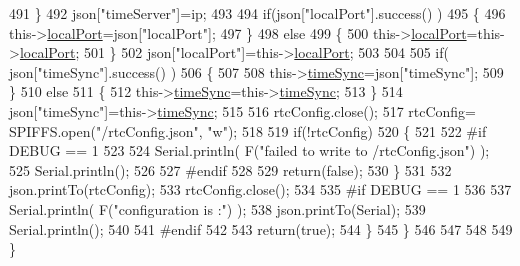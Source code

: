 \begin{DoxyCode}
491             \}
492             json[\textcolor{stringliteral}{"timeServer"}]=ip;
493             
494             \textcolor{keywordflow}{if}(json[\textcolor{stringliteral}{"localPort"}].success() )
495             \{                       
496                 this->\hyperlink{class_cool_time_a2f777da44d7ba678be8185299e9b49d1}{localPort}=json[\textcolor{stringliteral}{"localPort"}];
497             \}
498             \textcolor{keywordflow}{else}
499             \{
500                 this->\hyperlink{class_cool_time_a2f777da44d7ba678be8185299e9b49d1}{localPort}=this->\hyperlink{class_cool_time_a2f777da44d7ba678be8185299e9b49d1}{localPort};
501             \}
502             json[\textcolor{stringliteral}{"localPort"}]=this->\hyperlink{class_cool_time_a2f777da44d7ba678be8185299e9b49d1}{localPort};
503 
504 
505             \textcolor{keywordflow}{if}( json[\textcolor{stringliteral}{"timeSync"}].success() )
506             \{
507 
508                 this->\hyperlink{class_cool_time_a9d032e76c3470a15b3bbbc52af6463f7}{timeSync}=json[\textcolor{stringliteral}{"timeSync"}];
509             \}
510             \textcolor{keywordflow}{else}
511             \{
512                 this->\hyperlink{class_cool_time_a9d032e76c3470a15b3bbbc52af6463f7}{timeSync}=this->\hyperlink{class_cool_time_a9d032e76c3470a15b3bbbc52af6463f7}{timeSync};
513             \}
514             json[\textcolor{stringliteral}{"timeSync"}]=this->\hyperlink{class_cool_time_a9d032e76c3470a15b3bbbc52af6463f7}{timeSync};
515 
516             rtcConfig.close();
517             rtcConfig= SPIFFS.open(\textcolor{stringliteral}{"/rtcConfig.json"}, \textcolor{stringliteral}{"w"});
518             
519             \textcolor{keywordflow}{if}(!rtcConfig)
520             \{
521             
522 \textcolor{preprocessor}{            #if DEBUG == 1}
523 
524                 Serial.println( F(\textcolor{stringliteral}{"failed to write to /rtcConfig.json"}) );
525                 Serial.println();
526             
527 \textcolor{preprocessor}{            #endif}
528 
529                 \textcolor{keywordflow}{return}(\textcolor{keyword}{false});
530             \}
531             
532             json.printTo(rtcConfig);
533             rtcConfig.close();
534 
535 \textcolor{preprocessor}{        #if DEBUG == 1 }
536 
537             Serial.println( F(\textcolor{stringliteral}{"configuration is :"}) );
538             json.printTo(Serial);
539             Serial.println();
540         
541 \textcolor{preprocessor}{        #endif}
542         
543             \textcolor{keywordflow}{return}(\textcolor{keyword}{true}); 
544         \}
545     \}   
546 
547 
548 
549 \}
\end{DoxyCode}
